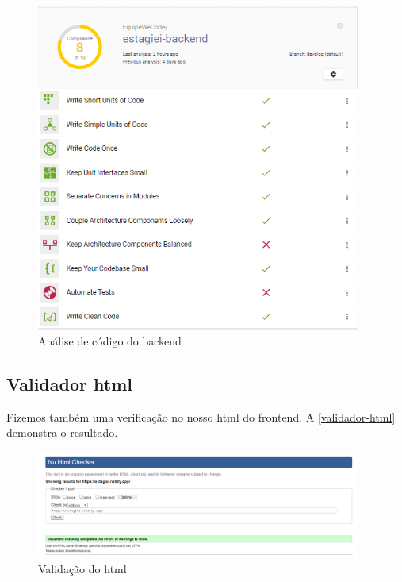 \begin{figure}[H]
	\centering
	\caption{\label{better-code-back}Análise de código do \gls{backend}}
	\includegraphics[width=0.95\textwidth]{../imagens/web-tests/better-code-back.png}
\end{figure}

\subsection{Validador \ac{html}}
Fizemos também uma verificação no nosso \ac{html} do \ac{frontend}. A \autoref{validador-html} demonstra o resultado.

\begin{figure}[H]
	\centering
	\caption{\label{validador-html}Validação do \ac{html}}
	\includegraphics[width=0.95\textwidth]{../imagens/web-tests/validador-html.png}
\end{figure}

